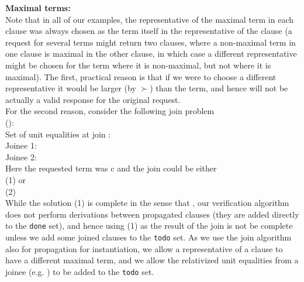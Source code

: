 \textbf{Maximal terms:}\\
Note that in all of our examples, the representative of the maximal term in each clause was always chosen as the term itself in the representative of the clause 
(a request for several terms might return two clauses, where a non-maximal term in one clause is maximal in the other clause, in which case a different representative might be chosen for the term where it is non-maximal, but not where it is maximal).
The first, practical reason is that if we were to choose a different representative it would be larger (by $\succ$) than the term, 
and hence will not be actually a valid response for the original request. \\
For the second reason, consider the following join problem\\
():\\
Set of unit equalities at join : \m{\emptyset}\\
Joinee 1: \\
Joinee 2: \\
Here the requested term was c and the join could be either \\
(1)  or\\
(2) \\
While the solution (1) is complete in the sense that ,
our verification algorithm does not perform derivations between propagated clauses (they are added directly to the \lstinline|done| set),
and hence using (1) as the result of the join is not be complete unless we add some joined clauses to the \lstinline|todo| set.
As we use the join algorithm also for propagation for instantiation, we allow a representative of a clause to have a different maximal term, and we allow the relativized unit equalities from a joinee (e.g. ) to be added to the \lstinline|todo| set.

